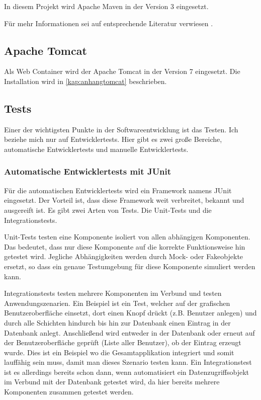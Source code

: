 In diesem Projekt wird Apache Maven in der Version 3 eingesetzt. 

Für mehr Informationen sei auf entsprechende Literatur verwiesen \citep[vgl.][]{Mitp-Verlag}.

\subsection{Apache Tomcat}
Als Web Container wird der \gls{Apache Tomcat} in der Version 7 eingesetzt. Die Installation wird in 
\autoref{kap:anhangtomcat} beschrieben. 
 
\subsection{Tests}

Einer der wichtigsten Punkte in der Softwareentwicklung ist das Testen. Ich beziehe mich nur auf Entwicklertests. Hier gibt es zwei große Bereiche, automatische Entwicklertests und manuelle Entwicklertests. 

\subsubsection{Automatische Entwicklertests mit JUnit}

Für die automatischen Entwicklertests wird ein Framework namens JUnit eingesetzt. Der Vorteil ist, dass diese Framework weit verbreitet, bekannt und ausgereift ist. 
Es gibt zwei Arten von Tests. Die \glspl{Unit-Test} und die \glspl{Integrationstest}. 

\glspl{Unit-Test} testen eine Komponente isoliert von allen abhängigen Komponenten. Das bedeutet, dass nur diese Komponente auf die korrekte Funktionsweise hin getestet wird. Jegliche Abhängigkeiten werden durch Mock- oder Fakeobjekte ersetzt, so dass ein genaue Testumgebung für diese Komponente simuliert werden kann. 

\glspl{Integrationstest} testen mehrere Komponenten im Verbund und testen Anwendungszenarien. Ein Beispiel ist ein Test, welcher auf der grafischen Benutzeroberfläche einsetzt, dort einen Knopf drückt (z.B. Benutzer anlegen) und durch alle Schichten hindurch bis hin zur Datenbank einen Eintrag in der Datenbank anlegt. Anschließend wird entweder in der Datenbank oder erneut auf der Benutzeroberfläche geprüft (Liste aller Benutzer), ob der Eintrag erzeugt wurde. 
Dies ist ein Beispiel wo die Gesamtapplikation integriert und somit lauffähig sein muss, damit man dieses Szenario testen kann. 
Ein Integrationstest ist es allerdings bereits schon dann, wenn automatisiert ein Datenzugriffsobjekt im Verbund mit der Datenbank getestet wird, da hier bereits mehrere Komponenten zusammen getestet werden. 

